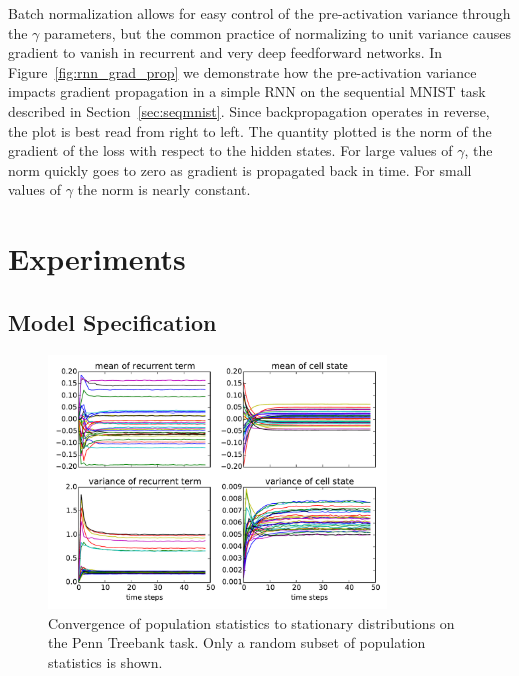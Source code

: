 \documentclass{article} %
\begin{document}
Batch normalization allows for easy control of the pre-activation variance through the $\gamma$ parameters,
but the common practice of normalizing to unit variance causes gradient to vanish in recurrent and very deep feedforward networks.
In Figure~\ref{fig:rnn_grad_prop} we demonstrate how the pre-activation variance impacts gradient propagation in a simple RNN on the sequential MNIST task described in Section~\ref{sec:seqmnist}.
Since backpropagation operates in reverse, the plot is best read from right to left.
The quantity plotted is the norm of the gradient of the loss with respect to the hidden states.
For large values of $\gamma$, the norm quickly goes to zero as gradient is propagated back in time.
For small values of $\gamma$ the norm is nearly constant.


\section{Experiments}
\label{sec:experiments}


\subsection{Model Specification}


\begin{figure}
\center
\includegraphics[width=0.8\textwidth]{figures/popstat_stationarity.pdf}
\caption{Convergence of population statistics to stationary distributions on the Penn Treebank task. Only a random subset of population statistics is shown.}
\label{fig:popstat_stationarity}
\end{figure}
\end{document}

